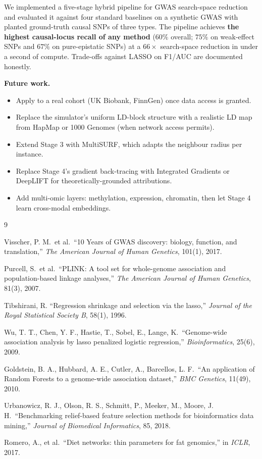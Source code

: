 \documentclass[11pt,a4paper]{article}
\begin{document}
We implemented a five-stage hybrid pipeline for GWAS search-space
reduction and evaluated it against four standard baselines on a
synthetic GWAS with planted ground-truth causal SNPs of three types.
The pipeline achieves \textbf{the highest causal-locus recall of any
method} ($60\%$ overall; $75\%$ on weak-effect SNPs and $67\%$ on
pure-epistatic SNPs) at a $66\times$ search-space reduction in under a
second of compute. Trade-offs against LASSO on F1/AUC are documented
honestly.

\textbf{Future work.}
\begin{itemize}[leftmargin=*,nosep]
\item Apply to a real cohort (UK Biobank, FinnGen) once data access is
      granted.
\item Replace the simulator's uniform LD-block structure with a
      realistic LD map from HapMap or 1000 Genomes (when network access
      permits).
\item Extend Stage 3 with MultiSURF, which adapts the neighbour radius
      per instance.
\item Replace Stage 4's gradient back-tracing with Integrated Gradients
      or DeepLIFT for theoretically-grounded attributions.
\item Add multi-omic layers: methylation, expression, chromatin, then
      let Stage 4 learn cross-modal embeddings.
\end{itemize}

\begin{thebibliography}{9}

 Visscher, P. M.\ et al.\ ``10 Years of GWAS
discovery: biology, function, and translation,''
\emph{The American Journal of Human Genetics}, 101(1), 2017.

 Purcell, S.\ et al.\ ``PLINK: A tool set for
whole-genome association and population-based linkage analyses,''
\emph{The American Journal of Human Genetics}, 81(3), 2007.

 Tibshirani, R. ``Regression shrinkage and
selection via the lasso,'' \emph{Journal of the Royal Statistical
Society B}, 58(1), 1996.

 Wu, T. T., Chen, Y. F., Hastie, T., Sobel, E., Lange, K.\
``Genome-wide association analysis by lasso penalized logistic
regression,'' \emph{Bioinformatics}, 25(6), 2009.

 Goldstein, B. A., Hubbard, A. E., Cutler, A.,
Barcellos, L. F.\ ``An application of Random Forests to a genome-wide
association dataset,'' \emph{BMC Genetics}, 11(49), 2010.

 Urbanowicz, R. J., Olson, R. S., Schmitt, P.,
Meeker, M., Moore, J. H.\ ``Benchmarking relief-based feature selection
methods for bioinformatics data mining,'' \emph{Journal of Biomedical
Informatics}, 85, 2018.

 Romero, A., et al.\ ``Diet networks: thin parameters
for fat genomics,'' in \emph{ICLR}, 2017.

\end{thebibliography}
\end{document}
